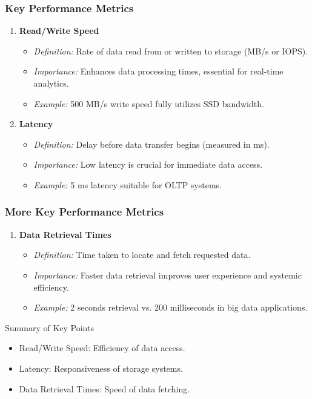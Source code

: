 \documentclass[aspectratio=169]{beamer}
\begin{document}
\begin{frame}
    \frametitle{Key Performance Metrics}
    \begin{enumerate}
        \item \textbf{Read/Write Speed}
            \begin{itemize}
                \item \textit{Definition:} Rate of data read from or written to storage (MB/s or IOPS).
                \item \textit{Importance:} Enhances data processing times, essential for real-time analytics.
                \item \textit{Example:} 500 MB/s write speed fully utilizes SSD bandwidth.
            \end{itemize}

        \item \textbf{Latency}
            \begin{itemize}
                \item \textit{Definition:} Delay before data transfer begins (measured in ms).
                \item \textit{Importance:} Low latency is crucial for immediate data access.
                \item \textit{Example:} 5 ms latency suitable for OLTP systems.
            \end{itemize}
    \end{enumerate}
\end{frame}

\begin{frame}
    \frametitle{More Key Performance Metrics}
    \begin{enumerate}[resume]
        \item \textbf{Data Retrieval Times}
            \begin{itemize}
                \item \textit{Definition:} Time taken to locate and fetch requested data.
                \item \textit{Importance:} Faster data retrieval improves user experience and systemic efficiency.
                \item \textit{Example:} 2 seconds retrieval vs. 200 milliseconds in big data applications.
            \end{itemize}
    \end{enumerate}

    \begin{block}{Summary of Key Points}
        \begin{itemize}
            \item Read/Write Speed: Efficiency of data access.
            \item Latency: Responsiveness of storage systems.
            \item Data Retrieval Times: Speed of data fetching.
        \end{itemize}
    \end{block}
\end{frame}
\end{document}
